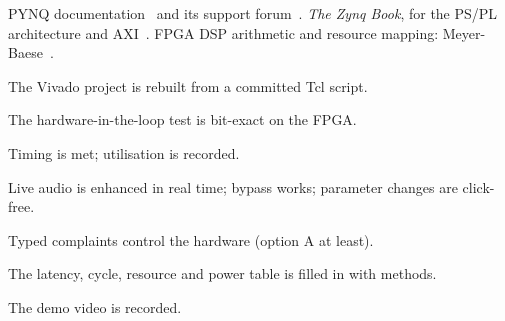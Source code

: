 \begin{readbox}
PYNQ documentation~\cite{ch12-13:pynqdocs} and its support
forum~\cite{ch12-13:pynqforum}. \emph{The Zynq Book}, for the PS/PL
architecture and AXI~\cite{ch12-13:crockett2014zynq}. FPGA DSP arithmetic and
resource mapping: Meyer-Baese~\cite{meyerbaese2014fpgadsp}.
\end{readbox}

\begin{donebox}
\begin{checklist}
  \item The Vivado project is rebuilt from a committed Tcl script.
  \item The hardware-in-the-loop test is bit-exact on the FPGA.
  \item Timing is met; utilisation is recorded.
  \item Live audio is enhanced in real time; bypass works; parameter changes are click-free.
  \item Typed complaints control the hardware (option A at least).
  \item The latency, cycle, resource and power table is filled in with methods.
  \item The demo video is recorded.
\end{checklist}
\end{donebox}
